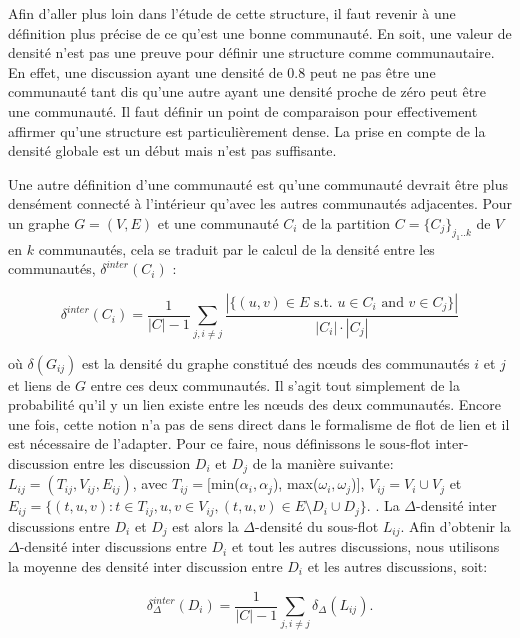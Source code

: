 Afin d'aller plus loin dans l'étude de cette structure, il faut revenir à une définition plus précise de ce qu'est une bonne communauté.
En soit, une valeur de densité n'est pas une preuve pour définir une structure comme communautaire.
En effet, une discussion ayant une densité de $0.8$ peut  ne pas être une communauté tant dis qu'une autre ayant une densité proche de zéro peut être une communauté.
Il faut définir un point de comparaison pour effectivement affirmer qu'une structure est particulièrement dense.
La prise en compte de la densité globale est un début mais n'est pas suffisante.

Une autre définition d'une communauté est qu'une communauté devrait être plus densément connecté à l'intérieur qu'avec les autres communautés adjacentes.
Pour un graphe $G=(V,E)$ et une communauté $C_i$ de la partition $C = \{C_j\}_{j_1..k}$ de $V$ en $k$ communautés, cela se traduit par le calcul de la densité entre les communautés, $\delta^{inter}(C_i)$ :

\begin{equation}
	\delta^{inter}(C_i) = \frac{1}{|C|-1}\sum_{j, i\ne j}\frac{|\{(u,v)\in E\mbox{ s.t. }u\in C_i\mbox{ and }v\in C_j\}|}{|C_i|\cdot |C_j|}
\end{equation}

où $\delta(G_{ij})$ est la densité du graphe constitué des n\oe uds des communautés $i$ et $j$ et liens de $G$ entre ces deux communautés.
Il s'agit tout simplement de la probabilité qu'il y un lien existe entre les n\oe uds des deux communautés.
Encore une fois, cette notion n'a pas de sens direct dans le formalisme de flot de lien et il est nécessaire de l'adapter.
Pour ce faire, nous définissons le sous-flot inter-discussion entre les discussion $D_i$ et $D_j$ de la manière suivante:  $L_{ij} = (T_{ij}, V_{ij}, E_{ij})$, avec $T_{ij} = [$min($\alpha_i,\alpha_j$), max($\omega_i, \omega_j$)$]$, $V_{ij} = V_i\cup V_j$ et $E_{ij} = \{(t,u,v): t\in T_{ij}, u,v\in V_{ij}, (t,u,v)\in E\setminus D_i\cup D_j\}$.
.
La $\Delta$-densité inter discussions entre $D_i$ et $D_j$ est alors la $\Delta$-densité du sous-flot $L_{ij}$.
Afin d'obtenir la $\Delta$-densité inter discussions entre $D_i$ et tout les autres discussions, nous utilisons la moyenne des densité inter discussion entre $D_i$ et les autres discussions, soit:

\begin{equation}
	\delta^{inter}_{\Delta}(D_i) = \frac{1}{|C|-1}\sum_{j,i\ne j} \delta_{\Delta}(L_{ij}).
\end{equation}

